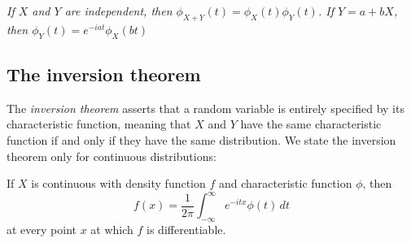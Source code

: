 \begin{theorem}%
\ben
\it If $X$ and $Y$ are independent, then $\phi_{X+Y}(t) = \phi_X(t)\phi_Y(t)$.
\it If $Y = a + bX$, then $\phi_Y(t) = e^{-iat}\phi_X(bt)$
\een
\end{theorem}
\proofomitted


\subsection{The inversion theorem} 
The \emph{inversion theorem} asserts that a random variable is entirely specified by its characteristic function, meaning that $X$ and $Y$ have the same characteristic function if and only if they have the same distribution. We state the inversion theorem only for continuous distributions:
\begin{theorem}
If $X$ is continuous with density function $f$ and characteristic function $\phi$, then
\[
f(x) = \frac{1}{2\pi}\int_{-\infty}^{\infty} e^{-itx}\phi(t)\,dt 
\] 
at every point $x$ at which $f$ is differentiable.
\end{theorem}
\proofomitted

